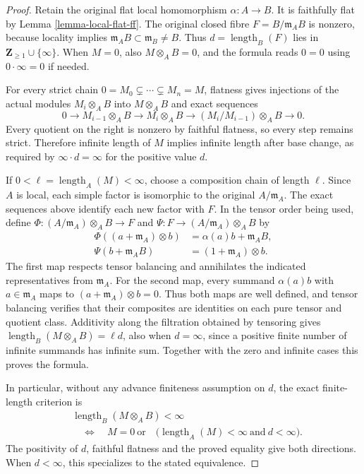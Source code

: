 \begin{proof}
Retain the original flat local homomorphism $\alpha:A\to B$.
It is faithfully flat by Lemma \ref{lemma-local-flat-ff}.
The original closed fibre
$F=B/\mathfrak m_AB$ is nonzero, because locality implies
$\mathfrak m_AB\subset\mathfrak m_B\neq B$.
Thus $d=\operatorname{length}_B(F)$ lies in
$\mathbf Z_{\geq1}\cup\{\infty\}$.
When $M=0$, also $M\otimes_A B=0$, and the formula reads
$0=0$ using $0\cdot\infty=0$ if needed.

For every strict chain $0=M_0\subsetneq\cdots\subsetneq M_n=M$,
flatness gives injections of the actual modules $M_i\otimes_A B$
into $M\otimes_A B$ and exact sequences
$$
0\longrightarrow M_{i-1}\otimes_A B
\longrightarrow M_i\otimes_A B
\longrightarrow (M_i/M_{i-1})\otimes_A B
\longrightarrow0.
$$
Every quotient on the right is nonzero by faithful flatness,
so every step remains strict. Therefore infinite length of $M$
implies infinite length after base change, as required by
$\infty\cdot d=\infty$ for the positive value $d$.

If $0<\ell=\operatorname{length}_A(M)<\infty$, choose a
composition chain of length $\ell$. Since $A$ is local, each
simple factor is isomorphic to the original $A/\mathfrak m_A$.
The exact sequences above identify each new factor with $F$.
In the tensor order being used, define
$\Phi:(A/\mathfrak m_A)\otimes_A B\to F$ and
$\Psi:F\to(A/\mathfrak m_A)\otimes_A B$ by
$$
\begin{aligned}
\Phi((a+\mathfrak m_A)\otimes b)&=\alpha(a)b+\mathfrak m_AB,\\
\Psi(b+\mathfrak m_AB)&=(1+\mathfrak m_A)\otimes b.
\end{aligned}
$$
The first map respects tensor balancing and annihilates the
indicated representatives from $\mathfrak m_A$.
For the second map, every summand $\alpha(a)b$ with
$a\in\mathfrak m_A$ maps to
$(a+\mathfrak m_A)\otimes b=0$. Thus both maps are well
defined, and tensor balancing verifies that their composites
are identities on each pure tensor and quotient class.
Additivity along the filtration obtained by tensoring gives
$\operatorname{length}_B(M\otimes_A B)=\ell d$,
also when $d=\infty$, since a positive finite number of
infinite summands has infinite sum.
Together with the zero and infinite cases this proves the formula.

In particular, without any advance finiteness assumption on $d$,
the exact finite-length criterion is
$$
\begin{aligned}
&\operatorname{length}_B(M\otimes_A B)<\infty\\
&\quad\Longleftrightarrow\quad
M=0\ \text{or}\quad
\bigl(\operatorname{length}_A(M)<\infty\ \text{and}\ d<\infty\bigr).
\end{aligned}
$$
The positivity of $d$, faithful flatness and the proved equality
give both directions. When $d<\infty$, this specializes to
the stated equivalence.
\end{proof}

